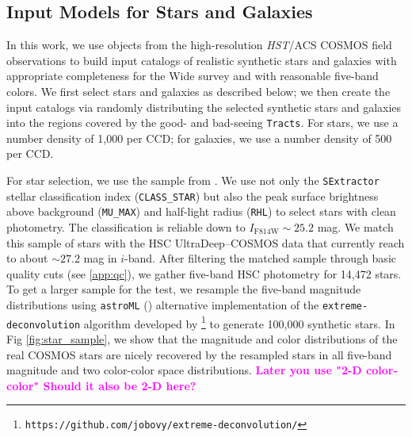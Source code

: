 \documentclass[useamsfonts]{pasj01}
\def\tracts{\texttt{Tracts}}
\def\hst{{\textit{HST}}}
\newcommand{\susan}[1]{\textcolor{magenta} {\textbf{#1}}}
\begin{document}

\subsection{Input Models for Stars and Galaxies}
    \label{ssec:inputs}

    In this work, we use objects from the high-resolution \hst{}/ACS COSMOS field observations to build input catalogs of realistic synthetic stars and galaxies with appropriate completeness for the Wide survey and with reasonable five-band colors. We first select stars and galaxies as described below;  we then create the input catalogs via randomly distributing the selected synthetic stars and galaxies into the regions covered by the good- and bad-seeing \tracts{}. For stars, we use a number density of 1,000 per CCD; for galaxies, we use a number density of  500 per CCD.
    
For star selection, we use the sample from \citet{Leauthaud2007}. 
     We use not only the \texttt{SExtractor} stellar classification index (\texttt{CLASS\_STAR}) but also the peak surface brightness above background (\texttt{MU\_MAX}) and
    half-light radius (\texttt{RHL}) to select stars with clean photometry. 
    The classification is reliable down to $I_{\mathrm{F814W}}{\sim}25.2$ mag.
    We match this sample of stars with the HSC UltraDeep--COSMOS data that currently
    reach to about ${\sim}27.2$ mag in $i$-band.
    After filtering the matched sample through basic quality cuts (see \ref{app:qc}),
    we gather five-band HSC photometry for 14,472 stars.
    To get a larger sample for the test, we resample the five-band magnitude
    distributions using \texttt{astroML} (\citealt{astroml}) alternative
    implementation of the \texttt{extreme-deconvolution} algorithm developed by
    \citet{Bovy2011}
    \footnote{\texttt{https://github.com/jobovy/extreme-deconvolution/}} to
    generate 100,000 synthetic stars.
    In Fig \ref{fig:star_sample}, we show that the magnitude and color distributions of
    the real COSMOS stars are nicely recovered by the resampled stars in all
   five-band magnitude and two color-color space distributions. \susan{Later you use "2-D color-color" Should it also be 2-D here?}
\end{document}

